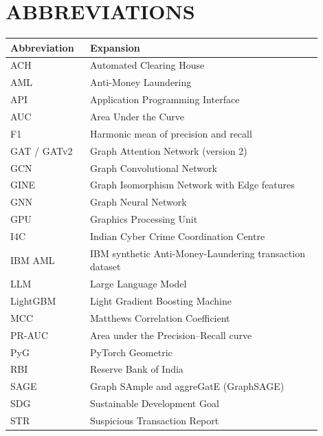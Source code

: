 \chapter*{ABBREVIATIONS}

\begin{center}
\renewcommand{\arraystretch}{1.25}
\begin{tabular}{|p{0.22\linewidth}|p{0.68\linewidth}|}
\hline
\textbf{Abbreviation} & \textbf{Expansion} \\ \hline
ACH & Automated Clearing House \\ \hline
AML & Anti-Money Laundering \\ \hline
API & Application Programming Interface \\ \hline
AUC & Area Under the Curve \\ \hline
F1 & Harmonic mean of precision and recall \\ \hline
GAT / GATv2 & Graph Attention Network (version 2) \\ \hline
GCN & Graph Convolutional Network \\ \hline
GINE & Graph Isomorphism Network with Edge features \\ \hline
GNN & Graph Neural Network \\ \hline
GPU & Graphics Processing Unit \\ \hline
I4C & Indian Cyber Crime Coordination Centre \\ \hline
IBM AML & IBM synthetic Anti-Money-Laundering transaction dataset \\ \hline
LLM & Large Language Model \\ \hline
LightGBM & Light Gradient Boosting Machine \\ \hline
MCC & Matthews Correlation Coefficient \\ \hline
PR-AUC & Area under the Precision--Recall curve \\ \hline
PyG & PyTorch Geometric \\ \hline
RBI & Reserve Bank of India \\ \hline
SAGE & Graph SAmple and aggreGatE (GraphSAGE) \\ \hline
SDG & Sustainable Development Goal \\ \hline
STR & Suspicious Transaction Report \\ \hline
\end{tabular}
\end{center}
